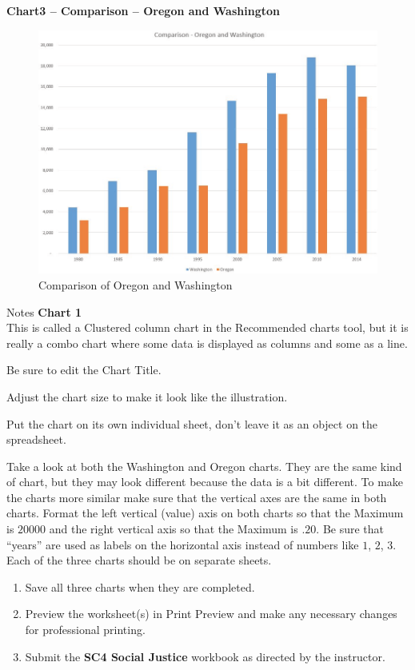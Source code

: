 \textbf{Chart3 – Comparison – Oregon and Washington}

\begin{figure}[H]
	\centering
	\includegraphics[width=\maxwidth{.95\linewidth}]{gfx/ch04_fig56}
	\caption{Comparison of Oregon and Washington}
	\label{04:fig56}
\end{figure}

\begin{center}
	\begin{infobox}{Notes}
		\textbf{Chart 1}
		\\
		This is called a Clustered column chart in the Recommended charts tool, but it is really a combo chart where some data is displayed as columns and some as a line.
		
		Be sure to edit the Chart Title.
		
		Adjust the chart size to make it look like the illustration.
		
		Put the chart on its own individual sheet, don’t leave it as an object on the spreadsheet.
	\end{infobox}
\end{center}

Take a look at both the Washington and Oregon charts. They are the same kind of chart, but they may look different because the data is a bit different. To make the charts more similar make sure that the vertical axes are the same in both charts. Format the left vertical (value) axis on both charts so that the Maximum is $ 20000 $ and the right vertical axis so that the Maximum is $ .20 $. Be sure that ``years'' are used as labels on the horizontal axis instead of numbers like $ 1 $, $ 2 $, $ 3 $. Each of the three charts should be on separate sheets.

\begin{enumerate}
	\item Save all three charts when they are completed. 
	\item Preview the worksheet(s) in Print Preview and make any necessary changes for professional printing.
	\item Submit the \textbf{SC4 Social Justice} workbook as directed by the instructor.
\end{enumerate}